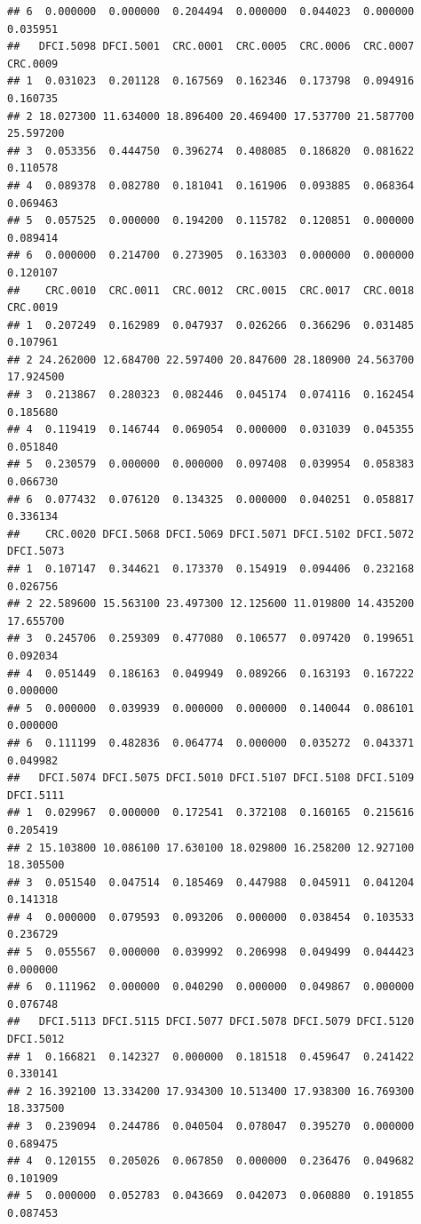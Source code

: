 \documentclass[
]{article}
\begin{document}
\begin{verbatim}
## 6  0.000000  0.000000  0.204494  0.000000  0.044023  0.000000  0.035951
##   DFCI.5098 DFCI.5001  CRC.0001  CRC.0005  CRC.0006  CRC.0007  CRC.0009
## 1  0.031023  0.201128  0.167569  0.162346  0.173798  0.094916  0.160735
## 2 18.027300 11.634000 18.896400 20.469400 17.537700 21.587700 25.597200
## 3  0.053356  0.444750  0.396274  0.408085  0.186820  0.081622  0.110578
## 4  0.089378  0.082780  0.181041  0.161906  0.093885  0.068364  0.069463
## 5  0.057525  0.000000  0.194200  0.115782  0.120851  0.000000  0.089414
## 6  0.000000  0.214700  0.273905  0.163303  0.000000  0.000000  0.120107
##    CRC.0010  CRC.0011  CRC.0012  CRC.0015  CRC.0017  CRC.0018  CRC.0019
## 1  0.207249  0.162989  0.047937  0.026266  0.366296  0.031485  0.107961
## 2 24.262000 12.684700 22.597400 20.847600 28.180900 24.563700 17.924500
## 3  0.213867  0.280323  0.082446  0.045174  0.074116  0.162454  0.185680
## 4  0.119419  0.146744  0.069054  0.000000  0.031039  0.045355  0.051840
## 5  0.230579  0.000000  0.000000  0.097408  0.039954  0.058383  0.066730
## 6  0.077432  0.076120  0.134325  0.000000  0.040251  0.058817  0.336134
##    CRC.0020 DFCI.5068 DFCI.5069 DFCI.5071 DFCI.5102 DFCI.5072 DFCI.5073
## 1  0.107147  0.344621  0.173370  0.154919  0.094406  0.232168  0.026756
## 2 22.589600 15.563100 23.497300 12.125600 11.019800 14.435200 17.655700
## 3  0.245706  0.259309  0.477080  0.106577  0.097420  0.199651  0.092034
## 4  0.051449  0.186163  0.049949  0.089266  0.163193  0.167222  0.000000
## 5  0.000000  0.039939  0.000000  0.000000  0.140044  0.086101  0.000000
## 6  0.111199  0.482836  0.064774  0.000000  0.035272  0.043371  0.049982
##   DFCI.5074 DFCI.5075 DFCI.5010 DFCI.5107 DFCI.5108 DFCI.5109 DFCI.5111
## 1  0.029967  0.000000  0.172541  0.372108  0.160165  0.215616  0.205419
## 2 15.103800 10.086100 17.630100 18.029800 16.258200 12.927100 18.305500
## 3  0.051540  0.047514  0.185469  0.447988  0.045911  0.041204  0.141318
## 4  0.000000  0.079593  0.093206  0.000000  0.038454  0.103533  0.236729
## 5  0.055567  0.000000  0.039992  0.206998  0.049499  0.044423  0.000000
## 6  0.111962  0.000000  0.040290  0.000000  0.049867  0.000000  0.076748
##   DFCI.5113 DFCI.5115 DFCI.5077 DFCI.5078 DFCI.5079 DFCI.5120 DFCI.5012
## 1  0.166821  0.142327  0.000000  0.181518  0.459647  0.241422  0.330141
## 2 16.392100 13.334200 17.934300 10.513400 17.938300 16.769300 18.337500
## 3  0.239094  0.244786  0.040504  0.078047  0.395270  0.000000  0.689475
## 4  0.120155  0.205026  0.067850  0.000000  0.236476  0.049682  0.101909
## 5  0.000000  0.052783  0.043669  0.042073  0.060880  0.191855  0.087453

\end{verbatim}
\end{document}

